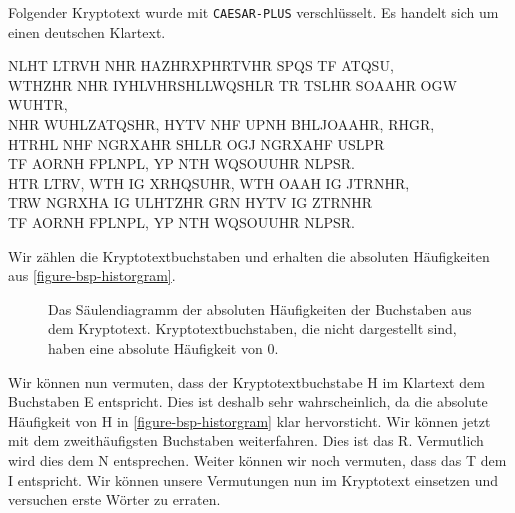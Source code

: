 \begin{example}
\label{example-hdr}

Folgender Kryptotext wurde mit \texttt{CAESAR-PLUS} verschlüsselt. Es handelt sich um einen deutschen Klartext.\\
	
\begin{linenumbers}
NLHT LTRVH NHR HAZHRXPHRTVHR SPQS TF ATQSU,\\
WTHZHR NHR IYHLVHRSHLLWQSHLR TR TSLHR SOAAHR OGW WUHTR,\\
NHR WUHLZATQSHR, HYTV NHF UPNH BHLJOAAHR, RHGR,\\
HTRHL NHF NGRXAHR SHLLR OGJ NGRXAHF USLPR\\
TF AORNH FPLNPL, YP NTH WQSOUUHR NLPSR.\\
HTR LTRV, WTH IG XRHQSUHR, WTH OAAH IG JTRNHR,\\
TRW NGRXHA IG ULHTZHR GRN HYTV IG ZTRNHR\\
TF AORNH FPLNPL, YP NTH WQSOUUHR NLPSR.
\end{linenumbers}

\vfill

Wir zählen die Kryptotextbuchstaben und erhalten die absoluten Häufigkeiten aus \autoref{figure-bsp-historgram}.

\begin{figure}[htb]
\centering
{}
\caption{Das Säulendiagramm der absoluten Häufigkeiten der Buchstaben aus dem Kryptotext. Kryptotextbuchstaben, die nicht dargestellt sind, haben eine absolute Häufigkeit von \num{0}.}
\label{figure-bsp-historgram}
\end{figure}

Wir können nun vermuten, dass der Kryptotextbuchstabe H im Klartext dem Buchstaben E entspricht. Dies ist deshalb sehr wahrscheinlich, da die absolute Häufigkeit von H in \autoref{figure-bsp-historgram} klar hervorsticht. Wir können jetzt mit dem zweithäufigsten Buchstaben weiterfahren. Dies ist das R. Vermutlich wird dies dem N entsprechen. Weiter können wir noch vermuten, dass das T dem I entspricht. Wir können unsere Vermutungen nun im Kryptotext einsetzen und versuchen erste Wörter zu erraten.


\end{example}
